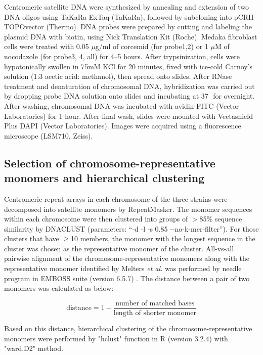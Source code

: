   Centromeric satellite DNA were synthesized by annealing and extension of two DNA oligos using TaKaRa ExTaq (TaKaRa), followed by subcloning into pCR\texttrademark II-TOPO\textregistered vector (Thermo). DNA probes were prepared by cutting and labeling the plasmid DNA with biotin, using Nick Translation Kit (Roche). Medaka fibroblast cells were treated with 0.05 $\mu$g/ml of corcemid (for probe1,2) or 1 $\mu$M of nocodazole (for probe3, 4, all) for 4--5 hours. After trypsinization, cells were hypotonically swollen in 75mM KCl for 20 minutes, fixed with ice-cold Carnoy's solution (1:3 acetic acid: methanol), then spread onto slides. After RNase treatment and denaturation of chromosomal DNA, hybridization was carried out by dropping probe DNA solution onto slides and incubating at 37\,\celsius\, for overnight. After washing, chromosomal DNA was incubated with avidin-FITC (Vector Laboratories) for 1 hour. After final wash, slides were mounted with Vectashield Plus DAPI (Vector Laboratories). Images were acquired using a fluorescence microscope (LSM710, Zeiss).


\subsection*{Selection of chromosome-representative monomers and hierarchical clustering}
  Centromeric repeat arrays in each chromosome of the three strains were decomposed into satellite monomers by RepeatMasker. The monomer sequences within each chromosome were then clustered into groups of $>$85\% sequence similarity by DNACLUST \cite{Ghodsi2011} (parameters: ``-d -l -s 0.85 {-}{-}no-k-mer-filter''). For those clusters that have $\geq$10 members, the monomer with the longest sequence in the cluster was chosen as the representative monomer of the cluster. All-vs-all pairwise alignment of the chromosome-representative monomers along with the representative monomer identified by Melters \textit{et al.} \cite{Melters2013} was performed by needle program in EMBOSS suite (version 6.5.7) \cite{Rice2000}. The distance between a pair of two monomers was calculated as below:

  \[
    \mbox{distance} = 1 - \frac{\mbox{number of matched bases}}{\mbox{length of shorter monomer}}
  \]

  Based on this distance, hierarchical clustering of the chromosome-representative monomers were performed by "hclust" function in R (version 3.2.4) with "ward.D2" method.
